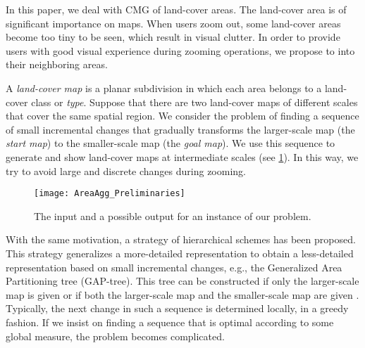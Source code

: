 \documentclass[acmsmall,natbib=false]{acmart}
\begin{document}



In this paper, we deal with CMG of land-cover areas.
The land-cover area is of significant importance on maps.
When users zoom out, some land-cover areas become
too tiny to be seen, which result in visual clutter.
In order to provide users 
with good visual experience during zooming operations,
we propose to  
into their neighboring areas.

A \emph{land-cover map} is a planar subdivision in which 
each area belongs to a land-cover class or \emph{type}.
Suppose that there are two land-cover maps of different scales 
that cover the same spatial region.
We consider the problem of finding a sequence 
of small incremental changes that gradually transforms 
the larger-scale map (the \emph{start map}) to 
the smaller-scale map (the \emph{goal map}).
We use this sequence to generate and show land-cover maps at 
intermediate scales (see \fig\ref{fig:AreaAgg_example}).
In this way, we try to avoid large and discrete changes
during zooming.

\begin{figure}[tb]
\centering
\texttt{[image: AreaAgg\_Preliminaries]}
\caption{The input and a possible output for an instance of 
our problem.}
\label{fig:AreaAgg_example}
\end{figure}

With the same motivation, 
a strategy of hierarchical schemes has been proposed.
This strategy generalizes a more-detailed representation 
to obtain a less-detailed representation 
based on small incremental changes, 
e.g., the Generalized Area Partitioning tree (GAP-tree).
This tree can be constructed if only the larger-scale map is given
\citep{vanOosterom2005} 
or if both the larger-scale map and the smaller-scale map 
are given \citep{HaunertDilo2009}.
Typically, the next change in such a sequence 
is determined locally, in a greedy fashion.  
If we insist on finding a sequence that is optimal 
according to some global measure,
the problem becomes complicated.
\end{document}
